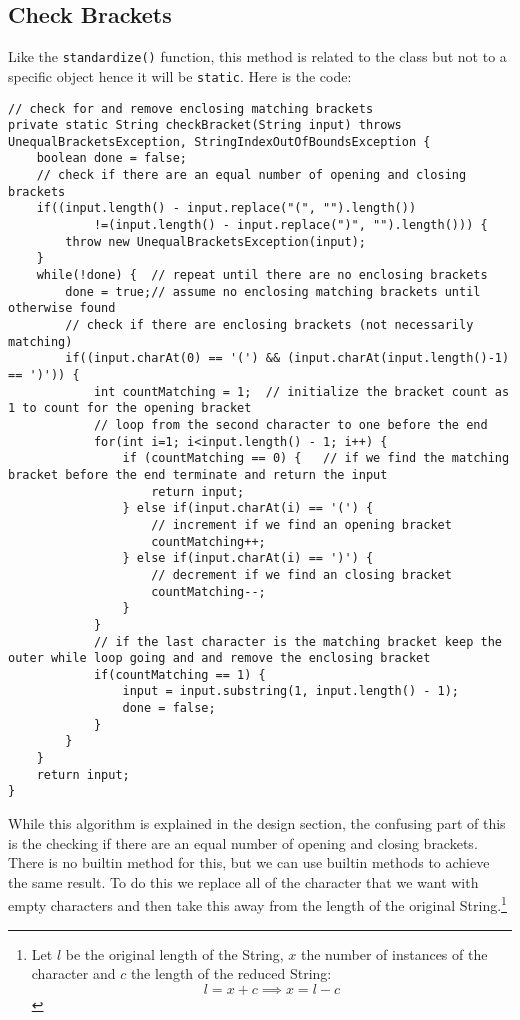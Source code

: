 \documentclass[../../../../main.tex]{subfiles}
\begin{document}
\subsection{Check Brackets}
Like the \texttt{standardize()} function, this method is related to the class but not to a specific object hence it will be \texttt{static}. Here is the code:
\begin{verbatim}
// check for and remove enclosing matching brackets
private static String checkBracket(String input) throws UnequalBracketsException, StringIndexOutOfBoundsException {
	boolean done = false;
	// check if there are an equal number of opening and closing brackets
	if((input.length() - input.replace("(", "").length())
			!=(input.length() - input.replace(")", "").length())) {
		throw new UnequalBracketsException(input);
	}
	while(!done) {	// repeat until there are no enclosing brackets
		done = true;// assume no enclosing matching brackets until otherwise found
		// check if there are enclosing brackets (not necessarily matching)
		if((input.charAt(0) == '(') && (input.charAt(input.length()-1) == ')')) {
			int countMatching = 1;	// initialize the bracket count as 1 to count for the opening bracket 
			// loop from the second character to one before the end
			for(int i=1; i<input.length() - 1; i++) {
				if (countMatching == 0) {	// if we find the matching bracket before the end terminate and return the input
					return input;
				} else if(input.charAt(i) == '(') {
					// increment if we find an opening bracket
					countMatching++;
				} else if(input.charAt(i) == ')') {
					// decrement if we find an closing bracket
					countMatching--;
				}			
			}
			// if the last character is the matching bracket keep the outer while loop going and and remove the enclosing bracket
			if(countMatching == 1) {	
				input = input.substring(1, input.length() - 1);
				done = false;
			}
		}
	}
	return input;
}
\end{verbatim}
While this algorithm is explained in the design section, the confusing part of this is the checking if there are an equal number of opening and closing brackets. There is no builtin method for this, but we can use builtin methods to achieve the same result. To do this\cite{countInstanceStringJava} we replace all of the character that we want with empty characters and then take this away from the length of the original String.\footnote{Let $l$ be the original length of the String, $x$ the number of instances of the character and $c$ the length of the reduced String:\[l = x + c \implies x = l - c\]}
\end{document}
